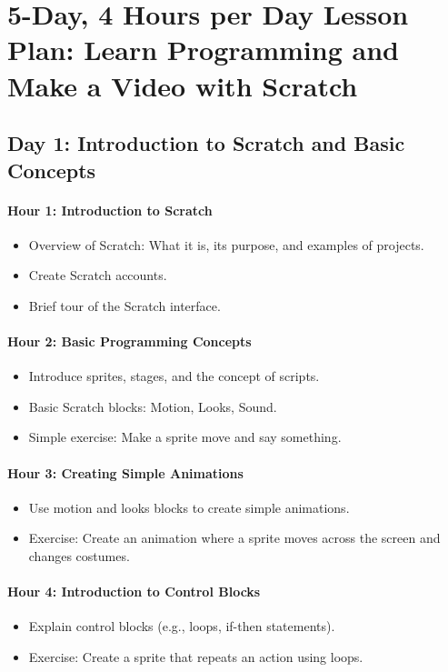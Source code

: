 \documentclass[main.tex]{subfiles}
\begin{document}
\section*{5-Day, 4 Hours per Day Lesson Plan: Learn Programming and Make a Video with Scratch}

\subsection*{Day 1: Introduction to Scratch and Basic Concepts}

\paragraph{Hour 1: Introduction to Scratch}
\begin{itemize}
  \item Overview of Scratch: What it is, its purpose, and examples of projects.
  \item Create Scratch accounts.
  \item Brief tour of the Scratch interface.
\end{itemize}

\paragraph{Hour 2: Basic Programming Concepts}
\begin{itemize}
  \item Introduce sprites, stages, and the concept of scripts.
  \item Basic Scratch blocks: Motion, Looks, Sound.
  \item Simple exercise: Make a sprite move and say something.
\end{itemize}

\paragraph{Hour 3: Creating Simple Animations}
\begin{itemize}
  \item Use motion and looks blocks to create simple animations.
  \item Exercise: Create an animation where a sprite moves across the screen and changes costumes.
\end{itemize}

\paragraph{Hour 4: Introduction to Control Blocks}
\begin{itemize}
  \item Explain control blocks (e.g., loops, if-then statements).
  \item Exercise: Create a sprite that repeats an action using loops.
\end{itemize}
\end{document}
